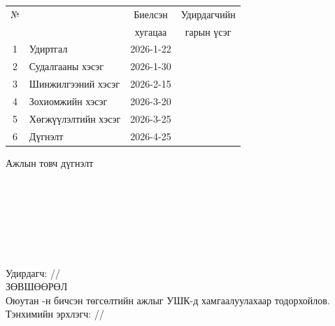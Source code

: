 \begin{titlepage}
\begin{center}
\begin{tabular}{|c|p{7cm}|c|c|}
	\hline
	№ & \makebox[7cm][c]{Хийж гүйцэтгэсэн ажил} & Биелсэн     & Удирдагчийн \\
	  &                    & хугацаа    & гарын үсэг \\ \hline
	1 & {Удиртгал}         & 2026-1-22 &  \\ \hline
	2 & {Судалгааны хэсэг}     & 2026-1-30 &  \\ \hline
	3 & {Шинжилгээний хэсэг} & 2026-2-15 &  \\ \hline
	4 & {Зохиомжийн хэсэг}    & 2026-3-20 &  \\ \hline
	5 & {Хөгжүүлэлтийн хэсэг}          & 2026-3-25 &  \\ \hline
        6 & {Дүгнэлт}          & 2026-4-25 &  \\ \hline
\end{tabular}

\vspace{1cm}
Ажлын товч дүгнэлт \\[0.5cm]
\dotfill \\[0.2cm]
\dotfill \\[0.2cm]
\dotfill \\[0.2cm]
\dotfill \\[0.2cm]
\dotfill \\[0.2cm]
\dotfill \\[0.2cm]
\dotfill \\[0.5cm]
Удирдагч: \makebox[3cm]{\dotfill} /\supname/ \\

\vspace{2cm}
ЗӨВШӨӨРӨЛ \\[0.5cm]
Оюутан \shortname -н бичсэн төгсөлтийн ажлыг УШК-д хамгаалуулахаар тодорхойлов.\\[0.5cm]
Тэнхимийн эрхлэгч: \makebox[3cm]{\dotfill} /\chairname/
\end{center}

\end{titlepage}

\newpage

